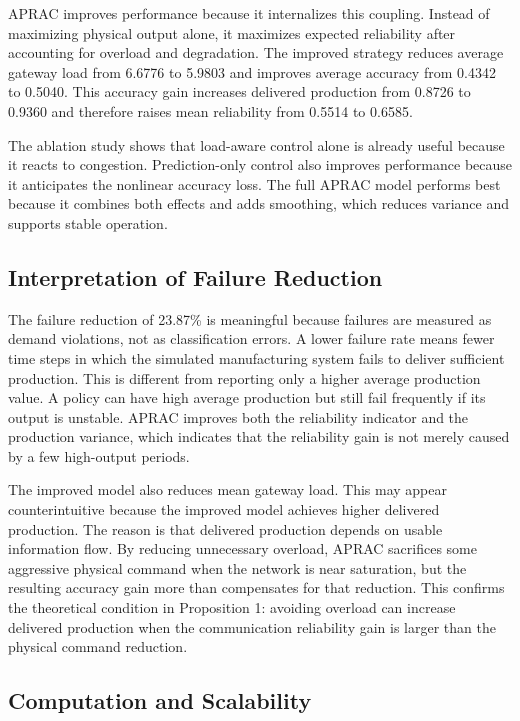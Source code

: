 \documentclass[journal]{IEEEtran}
\begin{document}
APRAC improves performance because it internalizes this coupling. Instead of maximizing physical output alone, it maximizes expected reliability after accounting for overload and degradation. The improved strategy reduces average gateway load from 6.6776 to 5.9803 and improves average accuracy from 0.4342 to 0.5040. This accuracy gain increases delivered production from 0.8726 to 0.9360 and therefore raises mean reliability from 0.5514 to 0.6585.

The ablation study shows that load-aware control alone is already useful because it reacts to congestion. Prediction-only control also improves performance because it anticipates the nonlinear accuracy loss. The full APRAC model performs best because it combines both effects and adds smoothing, which reduces variance and supports stable operation.

\subsection{Interpretation of Failure Reduction}

The failure reduction of 23.87\% is meaningful because failures are measured as demand violations, not as classification errors. A lower failure rate means fewer time steps in which the simulated manufacturing system fails to deliver sufficient production. This is different from reporting only a higher average production value. A policy can have high average production but still fail frequently if its output is unstable. APRAC improves both the reliability indicator and the production variance, which indicates that the reliability gain is not merely caused by a few high-output periods.

The improved model also reduces mean gateway load. This may appear counterintuitive because the improved model achieves higher delivered production. The reason is that delivered production depends on usable information flow. By reducing unnecessary overload, APRAC sacrifices some aggressive physical command when the network is near saturation, but the resulting accuracy gain more than compensates for that reduction. This confirms the theoretical condition in Proposition 1: avoiding overload can increase delivered production when the communication reliability gain is larger than the physical command reduction.

\subsection{Computation and Scalability}
\end{document}
